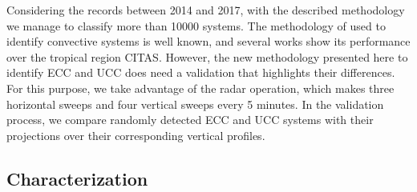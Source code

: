 \documentclass[preprint,12pt]{elsarticle}
\begin{document}
Considering the records between 2014 and 2017, with the described methodology we manage to classify more than 10000 systems.  The methodology of \citet{Steiner1995} used to identify convective systems is well known, and several works show its performance over the tropical region CITAS.  However, the new methodology presented here to identify ECC and UCC does need a validation that highlights their differences.   For this purpose, we take advantage of the radar operation, which makes three horizontal sweeps and four vertical sweeps every 5 minutes.  In the validation process, we compare randomly detected ECC and UCC systems with their projections over their corresponding vertical profiles.  

\subsection{Characterization}\label{sub:characterization}



\end{document}
